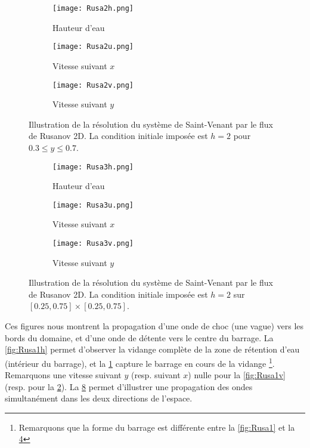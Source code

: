 \documentclass[
	french,
	11pt, %
]{fphw}
\begin{document}
\begin{figure}[H]
	\centering
	\begin{subfigure}{0.32\textwidth}
		\centering
		\texttt{[image: Rusa2h.png]}
		\caption{Hauteur d'eau}
		\label{fig:Rusa2h}
	\end{subfigure}
	\begin{subfigure}{0.32\textwidth}
		\centering
		\texttt{[image: Rusa2u.png]}
		\caption{Vitesse suivant $x$}
		\label{fig:Rusa2u}
	\end{subfigure}
	\begin{subfigure}{0.32\textwidth}
		\centering
		\texttt{[image: Rusa2v.png]}
		\caption{Vitesse suivant $y$}
		\label{fig:Rusa2v}
	\end{subfigure}
	\caption{Illustration de la résolution du système de Saint-Venant par le flux de Rusanov 2D. La condition initiale imposée est  $ h = 2$ pour $ 0.3 \leq y \leq 0.7$.}
	\label{fig:Rusa2}
\end{figure}


\begin{figure}[H]
	\centering
	\begin{subfigure}{0.32\textwidth}
		\centering
		\texttt{[image: Rusa3h.png]}
		\caption{Hauteur d'eau}
		\label{fig:Rusa3h}
	\end{subfigure}
	\begin{subfigure}{0.32\textwidth}
		\centering
		\texttt{[image: Rusa3u.png]}
		\caption{Vitesse suivant $x$}
		\label{fig:Rusa3u}
	\end{subfigure}
	\begin{subfigure}{0.32\textwidth}
		\centering
		\texttt{[image: Rusa3v.png]}
		\caption{Vitesse suivant $y$}
		\label{fig:Rusa3v}
	\end{subfigure}
	\caption{Illustration de la résolution du système de Saint-Venant par le flux de Rusanov 2D. La condition initiale imposée est $ h = 2$ sur $[0.25,0.75]\times[0.25,0.75]$.}
	\label{fig:Rusa3}
\end{figure}

\noindent Ces figures nous montrent la propagation d'une onde de choc (une vague) vers les bords du domaine, et d'une onde de détente vers le centre du barrage. La \cref{fig:Rusa1h} permet d'observer la vidange complète de la zone de rétention d'eau (intérieur du barrage), et la \cref{fig:Rusa2h} capture le barrage en cours de la vidange \footnote{Remarquons que la forme du barrage est différente entre la \cref{fig:Rusa1} et la \cref{fig:Rusa2}}. Remarquons une vitesse suivant $y$ (resp. suivant $x$) nulle pour la \cref{fig:Rusa1v} (resp. pour la \cref{fig:Rusa2u}). La \cref{fig:Rusa3} permet d'illustrer une propagation des ondes simultanément dans les deux directions de l'espace. 
\end{document}

